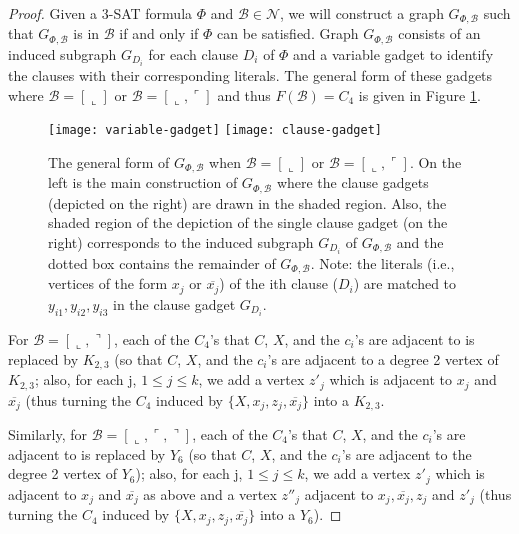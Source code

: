 \documentclass[11pt,3p,times]{elsarticle}
\newenvironment{myproof}{\begin{proof}}{\end{proof}}
\newcommand{\La}{\ensuremath{\llcorner}} \newcommand{\Lb}{\ensuremath{\ulcorner}} \newcommand{\Lc}{\ensuremath{\lrcorner}} \newcommand{\Ld}{\ensuremath{\urcorner}}
\begin{document}
\begin{myproof}
Given a 3-SAT formula $\Phi$ and $\mathcal{B} \in \mathcal{N}$,
we will construct a graph $G_{\Phi,\mathcal{B}}$
such that $G_{\Phi,\mathcal{B}}$ is in $\mathcal{B}$ if and only if $\Phi$ can be
satisfied. Graph $G_{\Phi,\mathcal{B}}$ consists of an induced subgraph $G_{D_i}$ for
each clause $D_i$ of $\Phi$ and a variable gadget to identify the
clauses with their corresponding literals. The general form of
these gadgets where $\mathcal{B}=[\La]$ or $\mathcal{B}=[\La,\Lb]$ and thus
$F(\mathcal{B})=C_4$ is given in Figure \ref{fig:gadgets}.
\begin{figure}[h]
\centering
\hfill
\texttt{[image: variable-gadget]}
\hfill
\texttt{[image: clause-gadget]}
\hfill \ 
\caption{The general form of $G_{\Phi,\mathcal{B}}$ when $\mathcal{B}=[\La]$ or
$\mathcal{B}=[\La,\Lb]$. On the left is the main construction of $G_{\Phi,\mathcal{B}}$ where the clause gadgets (depicted on the right) are drawn in the shaded region. Also, the shaded region of the depiction of the single clause gadget (on the right) corresponds to the induced subgraph $G_{D_i}$ of $G_{\Phi,\mathcal{B}}$ and the dotted box contains the remainder of $G_{\Phi,\mathcal{B}}$. Note: the literals (i.e., vertices of the form $x_j$ or
$\overline{x_j}$) of the ith clause ($D_i$) are matched to $y_{i1},y_{i2},y_{i3}$ in the clause gadget
$G_{D_i}$.} \label{fig:gadgets}
\end{figure}


For $\mathcal{B}=[\La,\Ld]$, each of the $C_4$'s that $C$, $X$, and the
$c_i$'s are adjacent to is replaced by $K_{2,3}$ (so that $C$, $X$, and the
$c_i$'s are adjacent to a degree 2 vertex of $K_{2,3}$; also, for each j,
$1 \leq j \leq k$, we add a vertex $z'_j$ which is adjacent to
$x_j$ and $\overline{x_j}$ (thus turning the $C_4$ induced by
$\{X, x_j, z_j, \overline{x_j}\}$ into a $K_{2,3}$.

Similarly, for $\mathcal{B}=[\La,\Lb,\Ld]$, each of the $C_4$'s that $C$, $X$, and the
$c_i$'s are adjacent to is replaced by $Y_6$ (so that $C$, $X$, and the
$c_i$'s are adjacent to the degree 2 vertex of $Y_6$); also, for each j,
$1 \leq j \leq k$, we add a vertex $z'_j$ which is adjacent to
$x_j$ and $\overline{x_j}$ as above and a vertex $z''_j$ adjacent to
$x_j, \overline{x_j}, z_j$ and $z'_j$  (thus turning the $C_4$ induced by
$\{X, x_j, z_j, \overline{x_j}\}$ into a $Y_6$).


\end{myproof}
\end{document}
